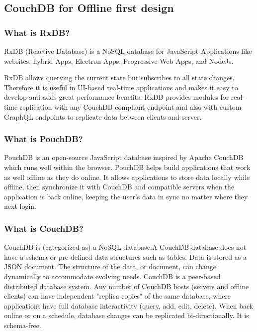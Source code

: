 \subsection{CouchDB for Offline first design}

\subsubsection{What is RxDB?}

RxDB (Reactive Database) is a NoSQL database for JavaScript Applications 
like websites, hybrid Apps, Electron-Apps, Progressive Web Apps, and NodeJs.

RxDB allows querying the current state but subscribes to all state changes.
Therefore it is useful in UI-based real-time applications and makes it easy to develop and adds great performance benefits.
RxDB provides modules for real-time replication with any CouchDB compliant endpoint and 
also with custom GraphQL endpoints to replicate data between clients and server.~\cite{RxDB}

\subsubsection{What is PouchDB?}

PouchDB is an open-source JavaScript database inspired by Apache CouchDB which runs well within the browser. PouchDB helps build applications that work as well offline as they do online. It allows applications to store data locally while offline, 
then synchronize it with CouchDB and compatible servers when the application is back online, keeping the user's data in sync no matter where they next login.~\cite{PouchGuide}

\subsubsection{What is CouchDB?}

CouchDB is (categorized as) a NoSQL database.A CouchDB database does not have a schema or pre-defined data structures such as tables. Data is stored as a JSON document. 
The structure of the data, or document, can change dynamically to accommodate evolving needs.  
CouchDB is a peer-based distributed database system. Any number of CouchDB hosts 
(servers and offline clients) can have independent "replica copies" of the same database, 
where applications have full database interactivity (query, add, edit, delete). 
When back online or on a schedule, database changes can be replicated bi-directionally.
It is schema-free.~\cite{CouchConfluence}

